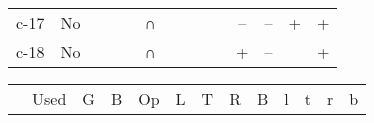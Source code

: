 \begin{tabular}[pos]{ | r | c | c | c | c | c | c | c | c | c | c | c | c | c | }
{\mktsStyleBold{}c-17} & No & \cjkgGlue{\cjk{}\cjkgGlue{\cnjzr{}}\cjkgGlue{}}\cjkgGlue{} &  & \cjkgGlue{\cjk{}\cjkgGlue{\cnjzr{}}\cjkgGlue{}}\cjkgGlue{} & {\mktsRsgFb{}∩} &  &  & \cjkgGlue{\cjk{}\cjkgGlue{\cnjzr{}}\cjkgGlue{}}\cjkgGlue{} & \cjkgGlue{\cjk{}\cjkgGlue{\cnjzr{}}\cjkgGlue{}}\cjkgGlue{} & – & – & + & +\\
{\mktsStyleBold{}c-18} & No & \cjkgGlue{\cjk{}\cjkgGlue{\cnjzr{}}\cjkgGlue{}}\cjkgGlue{} &  & \cjkgGlue{\cjk{}\cjkgGlue{\cnjzr{}}\cjkgGlue{}}\cjkgGlue{} & {\mktsRsgFb{}∩} & \cjkgGlue{\cjk{}\cjkgGlue{\cnjzr{}}\cjkgGlue{}}\cjkgGlue{} &  &  & \cjkgGlue{\cjk{}\cjkgGlue{\cnjzr{}}\cjkgGlue{}}\cjkgGlue{} & + & – &  & +\\
\hline
\end{tabular}



\begin{tabular}[pos]{ | r | c | c | c | c | c | c | c | c | c | c | c | c | }
\hline
 & {\mktsStyleBold{}Used} & {\mktsStyleBold{}G} & {\mktsStyleBold{}B} & {\mktsStyleBold{}Op} & {\mktsStyleBold{}L} & {\mktsStyleBold{}T} & {\mktsStyleBold{}R} & {\mktsStyleBold{}B} & {\mktsStyleBold{}l} & {\mktsStyleBold{}t} & {\mktsStyleBold{}r} & {\mktsStyleBold{}b}\\


\end{tabular}
